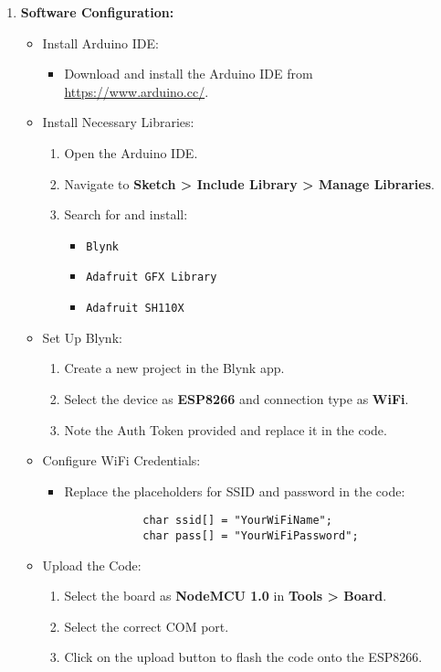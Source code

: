 {{\begin{enumerate}
    \item \textbf{Software Configuration:}
    \begin{itemize}
        \item Install Arduino IDE:
        \begin{itemize}
            \item Download and install the Arduino IDE from \url{https://www.arduino.cc/}.
        \end{itemize}
        \item Install Necessary Libraries:
        \begin{enumerate}
            \item Open the Arduino IDE.
            \item Navigate to \textbf{Sketch > Include Library > Manage Libraries}.
            \item Search for and install:
            \begin{itemize}
                \item \texttt{Blynk}
                \item \texttt{Adafruit GFX Library}
                \item \texttt{Adafruit SH110X}
            \end{itemize}
        \end{enumerate}
        \item Set Up Blynk:
        \begin{enumerate}
            \item Create a new project in the Blynk app.
            \item Select the device as \textbf{ESP8266} and connection type as \textbf{WiFi}.
            \item Note the Auth Token provided and replace it in the code.
        \end{enumerate}
        \item Configure WiFi Credentials:
        \begin{itemize}
            \item Replace the placeholders for SSID and password in the code:
            \begin{verbatim}
            char ssid[] = "YourWiFiName";
            char pass[] = "YourWiFiPassword";
            \end{verbatim}
        \end{itemize}
        \item Upload the Code:
        \begin{enumerate}
            \item Select the board as \textbf{NodeMCU 1.0} in \textbf{Tools > Board}.
            \item Select the correct COM port.
            \item Click on the upload button to flash the code onto the ESP8266.
        \end{enumerate}
    \end{itemize}
    

\end{enumerate}}}
